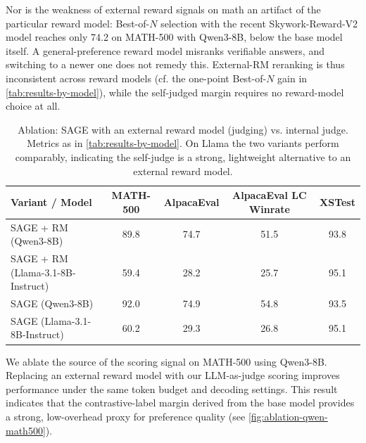 \documentclass[letterpaper]{article} %
\newcommand{\method}{SAGE}
\begin{document}
\textcolor{green!50!black}{Nor is the weakness of external reward signals on math an artifact of the particular reward model: Best-of-\(N\) selection with the recent Skywork-Reward-V2 model \citep{liu2025skywork} reaches only 74.2 on MATH-500 with Qwen3-8B, below the base model itself. A general-preference reward model misranks verifiable answers, and switching to a newer one does not remedy this.} \textcolor{orange!85!black}{External-RM reranking is thus inconsistent across reward models (cf. the one-point Best-of-\(N\) gain in \cref{tab:results-by-model}), while the self-judged margin requires no reward-model choice at all.}


\begin{table}[t]
\centering
\begin{small}
\begin{sc}
\begin{tabular}{lcccc}
\toprule
\textbf{Variant / Model} & \textbf{MATH-500} & \textbf{AlpacaEval} & \textbf{AlpacaEval LC Winrate} & \textbf{XSTest} \\
\midrule
\method{} + RM (Qwen3-8B) & 89.8 & 74.7 & \textcolor{orange!85!black}{51.5} & 93.8 \\
\method{} + RM (Llama-3.1-8B-Instruct) & 59.4 & \textcolor{orange!85!black}{28.2} & \textcolor{orange!85!black}{25.7} & 95.1 \\
\method{} (Qwen3-8B) & 92.0 & 74.9 & \textcolor{orange!85!black}{54.8} & 93.5 \\
\method{} (Llama-3.1-8B-Instruct) & 60.2 & \textcolor{orange!85!black}{29.3} & \textcolor{orange!85!black}{26.8} & 95.1 \\
\bottomrule
\end{tabular}
\end{sc}
\end{small}
\caption{Ablation: \method{} with an external reward model (judging) vs. internal judge. Metrics as in \cref{tab:results-by-model}. \textcolor{orange!85!black}{On Llama the two variants perform comparably, indicating the self-judge is a strong, lightweight alternative to an external reward model.}}
\label{tab:rm-ablation}
\end{table}

\noindent We ablate the source of the scoring signal on MATH-500 using Qwen3-8B. Replacing an external reward model with our LLM-as-judge scoring improves performance under the same token budget and decoding settings. This result indicates that the contrastive-label margin derived from the base model provides a strong, low-overhead proxy for preference quality (see \cref{fig:ablation-qwen-math500}).
\end{document}
